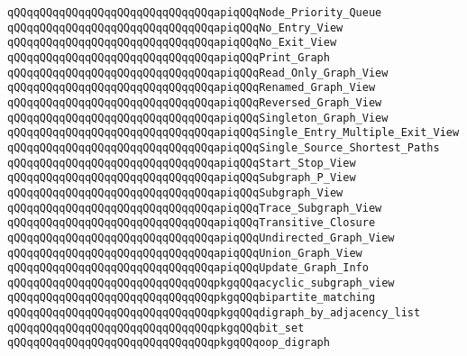 \verb|qQQqqQQqqQQqqQQqqQQqqQQqqQQqqQQqapiqQQqNode_Priority_Queue|\newline
\verb|qQQqqQQqqQQqqQQqqQQqqQQqqQQqqQQqapiqQQqNo_Entry_View|\newline
\verb|qQQqqQQqqQQqqQQqqQQqqQQqqQQqqQQqapiqQQqNo_Exit_View|\newline
\verb|qQQqqQQqqQQqqQQqqQQqqQQqqQQqqQQqapiqQQqPrint_Graph|\newline
\verb|qQQqqQQqqQQqqQQqqQQqqQQqqQQqqQQqapiqQQqRead_Only_Graph_View|\newline
\verb|qQQqqQQqqQQqqQQqqQQqqQQqqQQqqQQqapiqQQqRenamed_Graph_View|\newline
\verb|qQQqqQQqqQQqqQQqqQQqqQQqqQQqqQQqapiqQQqReversed_Graph_View|\newline
\verb|qQQqqQQqqQQqqQQqqQQqqQQqqQQqqQQqapiqQQqSingleton_Graph_View|\newline
\verb|qQQqqQQqqQQqqQQqqQQqqQQqqQQqqQQqapiqQQqSingle_Entry_Multiple_Exit_View|\newline
\verb|qQQqqQQqqQQqqQQqqQQqqQQqqQQqqQQqapiqQQqSingle_Source_Shortest_Paths|\newline
\verb|qQQqqQQqqQQqqQQqqQQqqQQqqQQqqQQqapiqQQqStart_Stop_View|\newline
\verb|qQQqqQQqqQQqqQQqqQQqqQQqqQQqqQQqapiqQQqSubgraph_P_View|\newline
\verb|qQQqqQQqqQQqqQQqqQQqqQQqqQQqqQQqapiqQQqSubgraph_View|\newline
\verb|qQQqqQQqqQQqqQQqqQQqqQQqqQQqqQQqapiqQQqTrace_Subgraph_View|\newline
\verb|qQQqqQQqqQQqqQQqqQQqqQQqqQQqqQQqapiqQQqTransitive_Closure|\newline
\verb|qQQqqQQqqQQqqQQqqQQqqQQqqQQqqQQqapiqQQqUndirected_Graph_View|\newline
\verb|qQQqqQQqqQQqqQQqqQQqqQQqqQQqqQQqapiqQQqUnion_Graph_View|\newline
\verb|qQQqqQQqqQQqqQQqqQQqqQQqqQQqqQQqapiqQQqUpdate_Graph_Info|\newline
\newline
\verb|qQQqqQQqqQQqqQQqqQQqqQQqqQQqqQQqpkgqQQqacyclic_subgraph_view|\newline
\verb|qQQqqQQqqQQqqQQqqQQqqQQqqQQqqQQqpkgqQQqbipartite_matching|\newline
\verb|qQQqqQQqqQQqqQQqqQQqqQQqqQQqqQQqpkgqQQqdigraph_by_adjacency_list|\newline
\verb|qQQqqQQqqQQqqQQqqQQqqQQqqQQqqQQqpkgqQQqbit_set|\newline
\verb|qQQqqQQqqQQqqQQqqQQqqQQqqQQqqQQqpkgqQQqoop_digraph|\newline
